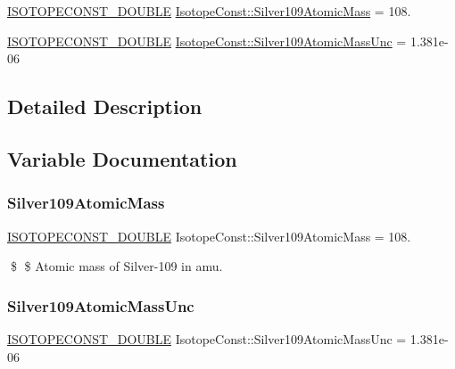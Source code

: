 \begin{DoxyCompactItemize}
\item 
\mbox{\hyperlink{group___isotope_const-_macros_ga8f45a7272ce02c0b4c65c44636ed719a}{I\+S\+O\+T\+O\+P\+E\+C\+O\+N\+S\+T\+\_\+\+D\+O\+U\+B\+LE}} \mbox{\hyperlink{group___isotope_const-_silver-_ag109_ga974efe685fa254fc73107753491573b9}{Isotope\+Const\+::\+Silver109\+Atomic\+Mass}} = 108.
\item 
\mbox{\hyperlink{group___isotope_const-_macros_ga8f45a7272ce02c0b4c65c44636ed719a}{I\+S\+O\+T\+O\+P\+E\+C\+O\+N\+S\+T\+\_\+\+D\+O\+U\+B\+LE}} \mbox{\hyperlink{group___isotope_const-_silver-_ag109_gaaefa52da1be5638d82c76de9789e199b}{Isotope\+Const\+::\+Silver109\+Atomic\+Mass\+Unc}} = 1.\+381e-\/06
\end{DoxyCompactItemize}


\subsection{Detailed Description}


\subsection{Variable Documentation}
\mbox{\label{group___isotope_const-_silver-_ag109_ga974efe685fa254fc73107753491573b9}} 
\subsubsection{\texorpdfstring{Silver109\+Atomic\+Mass}{Silver109AtomicMass}}
{\footnotesize\ttfamily \mbox{\hyperlink{group___isotope_const-_macros_ga8f45a7272ce02c0b4c65c44636ed719a}{I\+S\+O\+T\+O\+P\+E\+C\+O\+N\+S\+T\+\_\+\+D\+O\+U\+B\+LE}} Isotope\+Const\+::\+Silver109\+Atomic\+Mass = 108.}

\$ \$ Atomic mass of Silver-\/109 in amu. \mbox{\label{group___isotope_const-_silver-_ag109_gaaefa52da1be5638d82c76de9789e199b}} 
\subsubsection{\texorpdfstring{Silver109\+Atomic\+Mass\+Unc}{Silver109AtomicMassUnc}}
{\footnotesize\ttfamily \mbox{\hyperlink{group___isotope_const-_macros_ga8f45a7272ce02c0b4c65c44636ed719a}{I\+S\+O\+T\+O\+P\+E\+C\+O\+N\+S\+T\+\_\+\+D\+O\+U\+B\+LE}} Isotope\+Const\+::\+Silver109\+Atomic\+Mass\+Unc = 1.\+381e-\/06}

